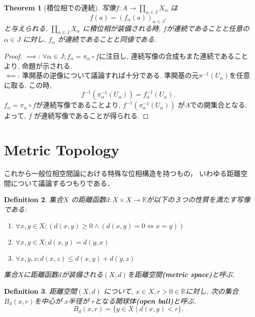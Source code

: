 \documentclass[dvipdfmx]{jbook}
\newtheorem{theorem}{Theorem}[section]
\newtheorem{definition}[theorem]{Definition}
\theoremstyle{remark}
\theoremstyle{plain}
\begin{document}
\begin{theorem}[積位相での連続]
	写像$f: A\to  \prod_{\alpha \in J} X_{\alpha}  $ は
	\[
	f(a) = (f_{\alpha}(a))_{\alpha \in J}
	.\] 
	と与えられる, $\prod_{\alpha \in J} X_{\alpha}  $ に積位相が装備される時, $f$が連続であることと任意の $\alpha \in J$ に対し, $f_{\alpha}$ が連続であることと同値である.
\end{theorem}

\begin{proof}
	$\implies$: $\forall \alpha \in J; f_{\alpha} = \pi_{\alpha} \circ f$に注目し, 連続写像の合成もまた連続であることより, 命題が示される.\\
	 $\impliedby$: 準開基の逆像について議論すれば十分である. 準開基の元$\pi^{-1}\left( U_{\alpha}\right) $を任意に取る. この時, 
	  \[
	 f^{-1}\left(\pi_{\alpha} ^{-1} \left( U_{\alpha}  \right) \right) = f_{\alpha}^{-1}\left( U_{\alpha} \right) 
	 .\] 
	 $f_{\alpha} = \pi_{\alpha} \circ f$が連続写像であることより, 
	 $f^{-1} \left( \pi_{\alpha} ^{-1}\left( U_{\alpha} \right)  \right) $ が$A$での開集合となる. 
	 よって,  $f$ が連続写像であることが得られる. 
\end{proof}


\section{Metric Topology}
これから一般位相空間論における特殊な位相構造を持つもの，
いわゆる距離空間について議論するつもりである．


\begin{definition}
	集合$X$ の距離函数$d : X \times X \to \mathbb{R}$が以下の３つの性質を満たす写像である:
	\begin{enumerate}
		\item $\forall x  , y \in X ; \left( d(x,y) \ge 0 \land \left( d(x,y) = 0  \iff x = y \right) \right)$ 
		\item $\forall x, y \in X; d(x,y) = d(y,x)$
		\item  $\forall x,y,z ; d(x,z) \le d(x,y) + d(y,z)$
	\end{enumerate}
	集合$X$に距離函数$d$が装備される$(X,d)$を距離空間\textbf{(metric space)}と呼ぶ.
\end{definition}

\begin{definition}
	距離空間$\left( X,d \right) $ について, $x \in X, r>0 \in  \mathbb{R}$に対し, 次の集合$B_d (x,r)$を中心が $x$半径が $r$となる開球体\textbf{(open ball)}と呼ぶ.
	 \[
	B_d(x,r) = \{y \in X \mid d(x,y) <r\} 
	.\] 
\end{definition}
\end{document}
